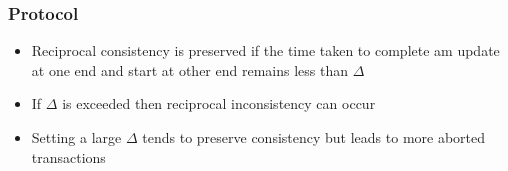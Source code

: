 \begin{frame}
  \frametitle{\tDelta Protocol}
  \begin{itemize}
  \item Reciprocal consistency is preserved if the time taken to complete am update at one end and start at other end remains less than  $\Delta$
  \item If $\Delta$ is exceeded then reciprocal inconsistency can occur
  \item Setting a large $\Delta$ tends to preserve consistency but leads to more aborted transactions
  \end{itemize}
\end{frame}